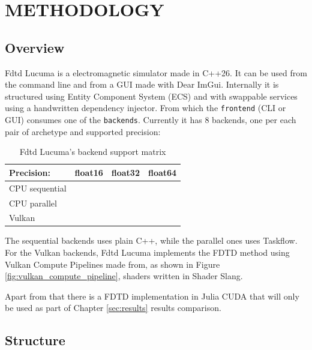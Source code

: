\documentclass[../main.tex]{subfiles}
\begin{document}
\newpage
\chapter{METHODOLOGY} \label{chapter:methodology}

\section{Overview}

Fdtd Lucuma is a electromagnetic simulator made in C++26.
It can be used from the command line and from a GUI made with Dear ImGui\cite{imgui}.
Internally it is structured using Entity Component System (ECS) and with swappable services using a handwritten dependency injector.
From which the \texttt{frontend} (CLI or GUI) consumes one of the \texttt{backends}.
Currently it has 8 backends, one per each pair of archetype and supported precision:

\begin{table}[H]
	\centering
	\begin{tabular}{l|c|c|c}
		Precision: & float16 & float32 & float64 \\
		\hline
		CPU sequential & \checkmark & \checkmark & \checkmark \\
		CPU parallel   & \checkmark & \checkmark & \checkmark \\
		Vulkan         & \checkmark & \checkmark & \times\footnotemark \\
	\end{tabular}
	\caption{Fdtd Lucuma's backend support matrix}
	\label{tab:nine_backends}
\end{table}

The sequential backends uses plain C++, while the parallel ones uses Taskflow\cite{Huang_2022}.
For the Vulkan backends, Fdtd Lucuma implements the FDTD method using Vulkan\cite{vulkanspec} Compute Pipelines made from, as shown in Figure \ref{fig:vulkan_compute_pipeline}, shaders written in Shader Slang\cite{10.1145/3197517.3201380}.

Apart from that there is a FDTD implementation in Julia CUDA\cite{besard2018juliagpu} that will only be used as part of Chapter \ref{sec:results} results comparison.

\section{Structure}
\end{document}
